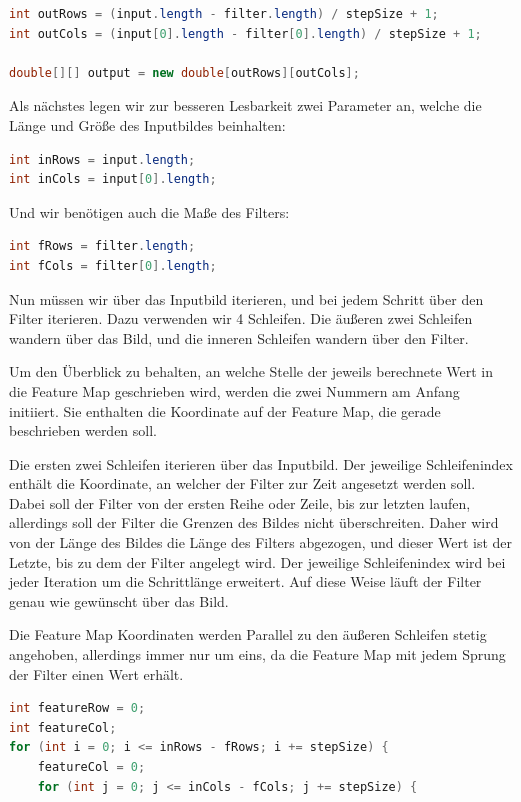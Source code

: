 \documentclass[12pt]{article}
\begin{document}
\begin{lstlisting}[language=Java]
int outRows = (input.length - filter.length) / stepSize + 1;
int outCols = (input[0].length - filter[0].length) / stepSize + 1;

double[][] output = new double[outRows][outCols];
\end{lstlisting}

Als nächstes legen wir zur besseren Lesbarkeit zwei Parameter an, welche die Länge und Größe des Inputbildes beinhalten:

\begin{lstlisting}[language=Java]
int inRows = input.length;
int inCols = input[0].length;
\end{lstlisting}

Und wir benötigen auch die Maße des Filters:

\begin{lstlisting}[language=Java]
int fRows = filter.length;
int fCols = filter[0].length;
\end{lstlisting}

Nun müssen wir über das Inputbild iterieren, und bei jedem Schritt über den Filter iterieren. Dazu verwenden wir 4 Schleifen. Die äußeren zwei Schleifen wandern über das Bild, und die inneren Schleifen wandern über den Filter. 

Um den Überblick zu behalten, an welche Stelle der jeweils berechnete Wert in die Feature Map geschrieben wird, werden die zwei Nummern am Anfang initiiert. Sie enthalten die Koordinate auf der Feature Map, die gerade beschrieben werden soll.

Die ersten zwei Schleifen iterieren über das Inputbild. Der jeweilige Schleifenindex enthält die Koordinate, an welcher der Filter zur Zeit angesetzt werden soll. Dabei soll der Filter von der ersten Reihe oder Zeile, bis zur letzten laufen, allerdings soll der Filter die Grenzen des Bildes nicht überschreiten. Daher wird von der Länge des Bildes die Länge des Filters abgezogen, und dieser Wert ist der Letzte, bis zu dem der Filter angelegt wird. Der jeweilige Schleifenindex wird bei jeder Iteration um die Schrittlänge erweitert. Auf diese Weise läuft der Filter genau wie gewünscht über das Bild.

Die Feature Map Koordinaten werden Parallel zu den äußeren Schleifen stetig angehoben, allerdings immer nur um eins, da die Feature Map mit jedem Sprung der Filter einen Wert erhält.

\begin{lstlisting}[language=Java]
int featureRow = 0;
int featureCol;
for (int i = 0; i <= inRows - fRows; i += stepSize) {
    featureCol = 0;
    for (int j = 0; j <= inCols - fCols; j += stepSize) {
\end{lstlisting}
\end{document}
